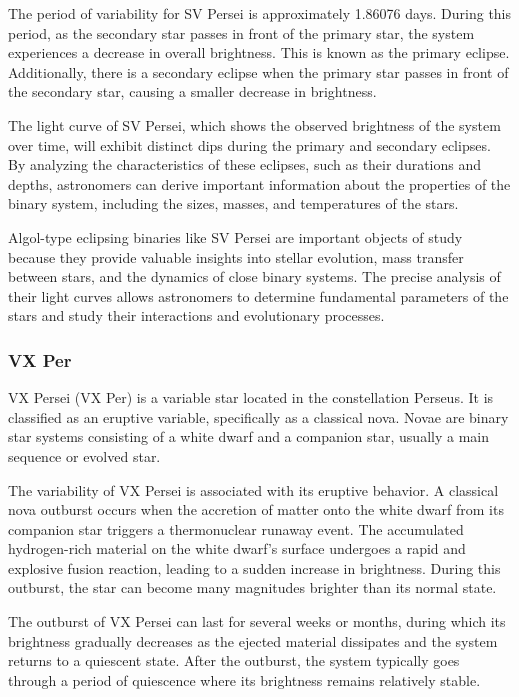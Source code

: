 The period of variability for SV Persei is approximately 1.86076 days. During this period, as the secondary star passes in front of the primary star, the system experiences a decrease in overall brightness. This is known as the primary eclipse. Additionally, there is a secondary eclipse when the primary star passes in front of the secondary star, causing a smaller decrease in brightness.

The light curve of SV Persei, which shows the observed brightness of the system over time, will exhibit distinct dips during the primary and secondary eclipses. By analyzing the characteristics of these eclipses, such as their durations and depths, astronomers can derive important information about the properties of the binary system, including the sizes, masses, and temperatures of the stars.

Algol-type eclipsing binaries like SV Persei are important objects of study because they provide valuable insights into stellar evolution, mass transfer between stars, and the dynamics of close binary systems. The precise analysis of their light curves allows astronomers to determine fundamental parameters of the stars and study their interactions and evolutionary processes.

\subsubsection*{ VX Per }
VX Persei (VX Per) is a variable star located in the constellation Perseus. It is classified as an eruptive variable, specifically as a classical nova. Novae are binary star systems consisting of a white dwarf and a companion star, usually a main sequence or evolved star.

The variability of VX Persei is associated with its eruptive behavior. A classical nova outburst occurs when the accretion of matter onto the white dwarf from its companion star triggers a thermonuclear runaway event. The accumulated hydrogen-rich material on the white dwarf's surface undergoes a rapid and explosive fusion reaction, leading to a sudden increase in brightness. During this outburst, the star can become many magnitudes brighter than its normal state.

The outburst of VX Persei can last for several weeks or months, during which its brightness gradually decreases as the ejected material dissipates and the system returns to a quiescent state. After the outburst, the system typically goes through a period of quiescence where its brightness remains relatively stable.

